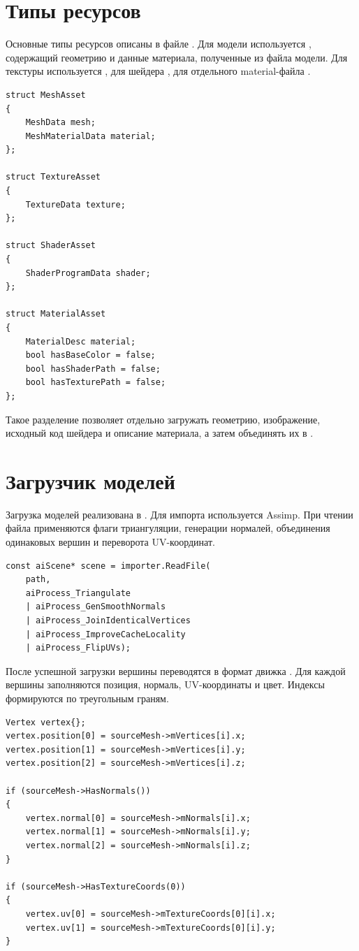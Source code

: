 \documentclass[14pt,a4paper]{extarticle}
\begin{document}
\section{Типы ресурсов}

Основные типы ресурсов описаны в файле . Для модели используется
, содержащий геометрию и данные материала, полученные из файла модели. Для текстуры
используется , для шейдера , для отдельного material-файла
.

\begin{lstlisting}[style=cppgost,caption={Основные типы ресурсов}]
struct MeshAsset
{
    MeshData mesh;
    MeshMaterialData material;
};

struct TextureAsset
{
    TextureData texture;
};

struct ShaderAsset
{
    ShaderProgramData shader;
};

struct MaterialAsset
{
    MaterialDesc material;
    bool hasBaseColor = false;
    bool hasShaderPath = false;
    bool hasTexturePath = false;
};
\end{lstlisting}

Такое разделение позволяет отдельно загружать геометрию, изображение, исходный код шейдера и описание
материала, а затем объединять их в .

\section{Загрузчик моделей}

Загрузка моделей реализована в . Для импорта используется Assimp. При чтении файла
применяются флаги триангуляции, генерации нормалей, объединения одинаковых вершин и переворота UV-координат.

\begin{lstlisting}[style=cppgost,caption={Чтение модели через Assimp}]
const aiScene* scene = importer.ReadFile(
    path,
    aiProcess_Triangulate
    | aiProcess_GenSmoothNormals
    | aiProcess_JoinIdenticalVertices
    | aiProcess_ImproveCacheLocality
    | aiProcess_FlipUVs);
\end{lstlisting}

После успешной загрузки вершины переводятся в формат движка . Для каждой вершины
заполняются позиция, нормаль, UV-координаты и цвет. Индексы формируются по треугольным граням.

\begin{lstlisting}[style=cppgost,caption={Формирование вершины меша}]
Vertex vertex{};
vertex.position[0] = sourceMesh->mVertices[i].x;
vertex.position[1] = sourceMesh->mVertices[i].y;
vertex.position[2] = sourceMesh->mVertices[i].z;

if (sourceMesh->HasNormals())
{
    vertex.normal[0] = sourceMesh->mNormals[i].x;
    vertex.normal[1] = sourceMesh->mNormals[i].y;
    vertex.normal[2] = sourceMesh->mNormals[i].z;
}

if (sourceMesh->HasTextureCoords(0))
{
    vertex.uv[0] = sourceMesh->mTextureCoords[0][i].x;
    vertex.uv[1] = sourceMesh->mTextureCoords[0][i].y;
}
\end{lstlisting}
\end{document}
